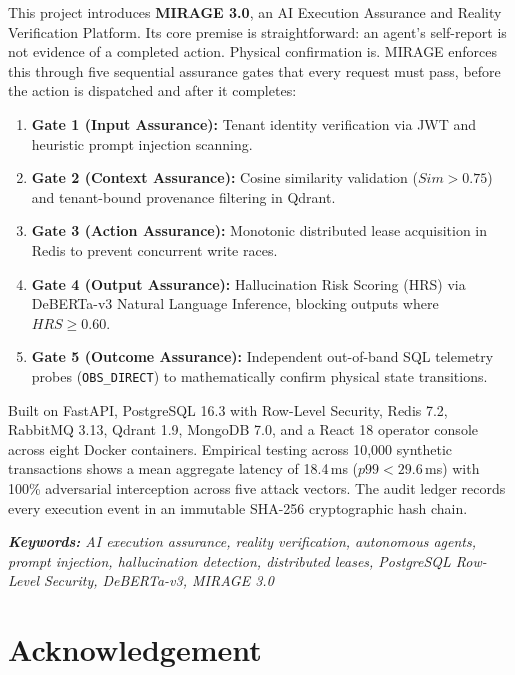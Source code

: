 \documentclass[12pt,a4paper]{report}
\numberwithin{equation}{section}
\begin{document}
\vspace{0.3cm}
This project introduces \textbf{MIRAGE 3.0}, an AI Execution Assurance and Reality Verification Platform. Its core premise is straightforward: an agent's self-report is not evidence of a completed action. Physical confirmation is. MIRAGE enforces this through five sequential assurance gates that every request must pass, before the action is dispatched and after it completes:
\begin{enumerate}
    \item \textbf{Gate 1 (Input Assurance):} Tenant identity verification via JWT and heuristic prompt injection scanning.
    \item \textbf{Gate 2 (Context Assurance):} Cosine similarity validation ($Sim > 0.75$) and tenant-bound provenance filtering in Qdrant.
    \item \textbf{Gate 3 (Action Assurance):} Monotonic distributed lease acquisition in Redis to prevent concurrent write races.
    \item \textbf{Gate 4 (Output Assurance):} Hallucination Risk Scoring (HRS) via DeBERTa-v3 Natural Language Inference, blocking outputs where $HRS \ge 0.60$.
    \item \textbf{Gate 5 (Outcome Assurance):} Independent out-of-band SQL telemetry probes (\texttt{OBS\_DIRECT}) to mathematically confirm physical state transitions.
\end{enumerate}

\vspace{0.3cm}
Built on FastAPI, PostgreSQL 16.3 with Row-Level Security, Redis 7.2, RabbitMQ 3.13, Qdrant 1.9, MongoDB 7.0, and a React 18 operator console across eight Docker containers. Empirical testing across 10,000 synthetic transactions shows a mean aggregate latency of 18.4\,ms ($p99 < 29.6$\,ms) with 100\% adversarial interception across five attack vectors. The audit ledger records every execution event in an immutable SHA-256 cryptographic hash chain.

\vspace{0.4cm}
\noindent\textit{\textbf{Keywords:} AI execution assurance, reality verification, autonomous agents, prompt injection, hallucination detection, distributed leases, PostgreSQL Row-Level Security, DeBERTa-v3, MIRAGE 3.0}

\newpage

\chapter*{Acknowledgement}
\end{document}
